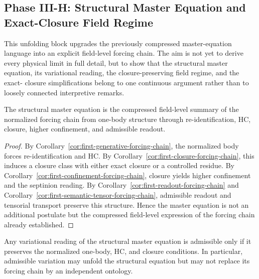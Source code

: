 \subsection*{Phase III-H: Structural Master Equation and Exact-Closure Field Regime}

This unfolding block upgrades the previously compressed master-equation language
into an explicit field-level forcing chain. The aim is not yet to derive every
physical limit in full detail, but to show that the structural master equation,
its variational reading, the closure-preserving field regime, and the exact-
closure simplifications belong to one continuous argument rather than to loosely
connected interpretive remarks.

\begin{lemma}
\label{lem:structural-master-equation}
The structural master equation is the compressed field-level summary of the
normalized forcing chain from one-body structure through re-identification, HC,
closure, higher confinement, and admissible readout.
\end{lemma}

\begin{proof}
By Corollary~\ref{cor:first-generative-forcing-chain}, the normalized body
forces re-identification and HC. By Corollary~\ref{cor:first-closure-forcing-chain},
this induces a closure class with either exact closure or a controlled residue.
By Corollary~\ref{cor:first-confinement-forcing-chain}, closure yields higher
confinement and the septinion reading. By Corollary~\ref{cor:first-readout-forcing-chain}
and Corollary~\ref{cor:first-semantic-tensor-forcing-chain}, admissible readout
and tensorial transport preserve this structure. Hence the master equation is not
an additional postulate but the compressed field-level expression of the forcing
chain already established.
\end{proof}

\begin{lemma}
\label{lem:variational-consistency}
Any variational reading of the structural master equation is admissible only if
it preserves the normalized one-body, HC, and closure conditions. In
particular, admissible variation may unfold the structural equation but may not
replace its forcing chain by an independent ontology.
\end{lemma}

